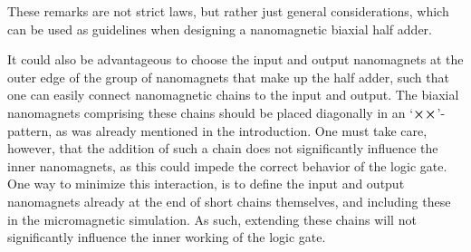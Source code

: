 \documentclass[11pt,a4paper,english,twoside]{article}
\begin{document}
These remarks are not strict laws, but rather just general considerations, which can be used as guidelines when designing a nanomagnetic biaxial half adder. \par
It could also be advantageous to choose the input and output nanomagnets at the outer edge of the group of nanomagnets that make up the half adder, such that one can easily connect nanomagnetic chains to the input and output. The biaxial nanomagnets comprising these chains should be placed diagonally in an `$\cross \cross$'-pattern, as was already mentioned in the introduction. One must take care, however, that the addition of such a chain does not significantly influence the inner nanomagnets, as this could impede the correct behavior of the logic gate. One way to minimize this interaction, is to define the input and output nanomagnets already at the end of short chains themselves, and including these in the micromagnetic simulation. As such, extending these chains will not significantly influence the inner working of the logic gate. \par %


\cleardoublepage
\end{document}
